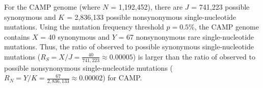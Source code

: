 For the CAMP genome
(where $N$ = 1,192,452),
there are $J$ = 741,223 possible synonymous and
$K$ = 2,836,133 possible nonsynonymous single-nucleotide mutations.
%
Using the mutation frequency threshold $p = 0.5\%$,
the CAMP genome contains
$X$ = 40 synonymous and
$Y$ = 67 nonsynonymous rare single-nucleotide mutations.
%
Thus, the ratio of observed to possible synonymous single-nucleotide mutations
($R_S = X / J = \frac{40}{741,223}
\approx 0.00005$)
is larger than the ratio of observed to possible nonsynonymous single-nucleotide mutations
($R_N = Y / K = \frac{67}{2,836,133}
\approx 0.00002$)
for CAMP.
\endinput